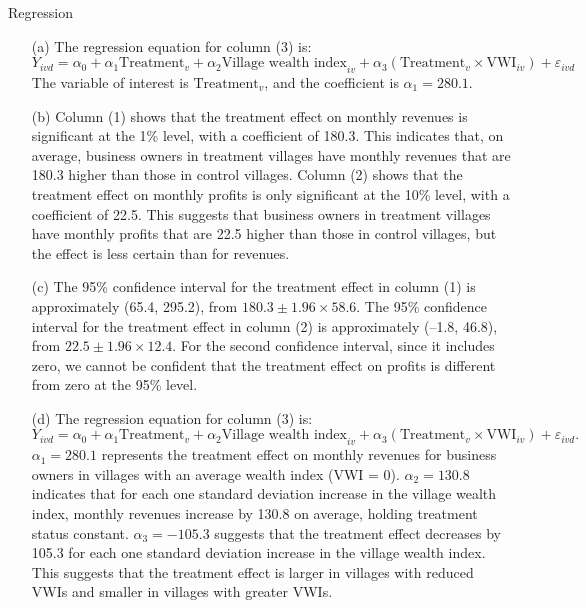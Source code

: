 \begin{homeworkProblem}{Regression}
\begin{solution}
        \begin{itemize}
            \item[(a)] The regression equation for column (3) is:
                \[
                    Y_{ivd} = \alpha_0 + \alpha_1 \text{Treatment}_{v} + 
                    \alpha_2 \text{Village wealth index}_{iv} + 
                    \alpha_3 \left( \text{Treatment}_{v} \times 
                    \text{VWI}_{iv} \right) + \varepsilon_{ivd}
                \]
                The variable of interest is $\text{Treatment}_v$, and the
                coefficient is $\alpha_1 = 280.1$.
            \item[(b)] Column (1) shows that the treatment effect on monthly
                revenues is significant at the 1\% level, with a coefficient
                of 180.3. This indicates that, on average, business owners in
                treatment villages have monthly revenues that are 180.3
                higher than those in control villages. Column (2) shows that
                the treatment effect on monthly profits is only significant at
                the 10\% level, with a coefficient of 22.5. This suggests that
                business owners in treatment villages have monthly profits that
                are 22.5 higher than those in control villages, but the effect
                is less certain than for revenues.
            \item[(c)] The 95\% confidence interval for the treatment effect 
                in column (1) is approximately (65.4, 295.2), from
                $180.3 \pm 1.96 \times 58.6$. The 95\% confidence interval for
                the treatment effect in column (2) is approximately 
                (–1.8, 46.8), from $22.5 \pm 1.96 \times 12.4$. For the second 
                confidence interval, since it includes zero, we cannot be 
                confident that the treatment effect on profits is different 
                from zero at the 95\% level.
            \item[(d)] The regression equation for column (3) is:
                \[
                    Y_{ivd} = \alpha_0 + \alpha_1 \text{Treatment}_{v} + 
                    \alpha_2 \text{Village wealth index}_{iv} + 
                    \alpha_3 \left( \text{Treatment}_{v} \times 
                    \text{VWI}_{iv} \right) + \varepsilon_{ivd}.
                \]
                $\alpha_1 = 280.1$ represents the treatment effect on
                monthly revenues for business owners in villages with an
                average wealth index (VWI = 0). $\alpha_2 = 130.8$ indicates
                that for each one standard deviation increase in the village
                wealth index, monthly revenues increase by 130.8 on average,
                holding treatment status constant. $\alpha_3 = -105.3$ suggests
                that the treatment effect decreases by 105.3 for each one
                standard deviation increase in the village wealth index. This
                suggests that the treatment effect is larger in villages with
                reduced VWIs and smaller in villages with greater VWIs. \\


\end{itemize}
\end{solution}
\end{homeworkProblem}
